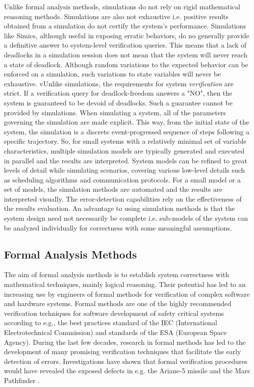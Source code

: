Unlike formal analysis methods, simulations do not rely on rigid mathematical
reasoning methods. Simulations are also not exhaustive i.e. positive results
obtained from a simulation do not certify the system's performance. Simulations
like Simics, although useful in exposing erratic behaviors, do no generally
provide a definitive answer to system-level verification queries. This means
that a lack of deadlocks in a simulation session does not mean that the system
will never reach a state of deadlock. Although random variations to the expected
behavior can be enforced on a simulation, such variations to state variables
will never be exhaustive. vUnlike simulations, the requirements for system
\emph{verification} are strict. If a verification query for deadlock-freedom
answers a "NO", then the system is guaranteed to be devoid of deadlocks. Such a
guarantee cannot be provided by simulations. When simulating a system, all of
the parameters governing the simulation are made explicit. This way, from the
initial state of the system, the simulation is a discrete event-progressed
sequence of steps following a specific trajectory. So, for small systems with a
relatively minimal set of variable characteristics, multiple simulation models
are typically generated and executed in parallel and the results are
interpreted. System models can be refined to great levels of detail while
simulating scenarios, covering various low-level details such as scheduling
algorithms and communication protocols. For a small model or a set of models,
the simulation methods are automated and the results are interpreted visually.
The error-detection capabilities rely on the effectiveness of the results
evaluation. An advantage to using simulation methods is that the system design
need not necessarily be complete i.e. sub-models of the system can be analyzed
individually for correctness with some meaningful assumptions.

\subsection{Formal Analysis Methods}

The aim of formal analysis methods is to establish system correctness with
mathematical techniques, mainly logical reasoning. Their potential has led to an
increasing use by engineers of formal methods for verification of complex
software and hardware systems. Formal methods are one of the highly recommended
verification techniques for software development of safety critical systems
according to e.g., the best practices standard of the IEC (International
Electrotechnical Commission) and standards of the ESA (European Space Agency).
During the last few decades, research in formal methods has led to the
development of many promising verification techniques that facilitate the early
detection of errors. Investigations have shown that formal verification
procedures would have revealed the exposed defects in e.g. the Ariane-5 missile
\cite{lions1996ariane} and the Mars Pathfinder \cite{jones1997really,
morrison1996board}.

